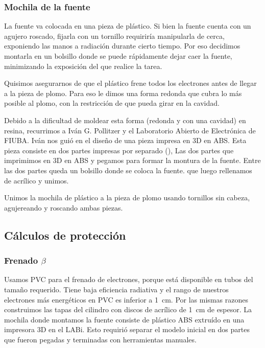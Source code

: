 \subsubsection{Mochila de la fuente}
La fuente va colocada en una pieza de plástico.
Si bien la fuente cuenta con un agujero roscado,
fijarla con un tornillo requiriría manipularla de cerca,
exponiendo las manos a radiación durante cierto tiempo.
Por eso decidimos montarla en un bolsillo donde se puede 
rápidamente dejar caer la fuente,
minimizando la exposición del que realice la tarea.

Quisimos asegurarnos de que el plástico frene todos los electrones antes de llegar a
la pieza de plomo. 
Para eso le dimos una forma redonda que cubra lo más posible al plomo,
con la restricción de que pueda girar en la cavidad.

Debido a la dificultad de moldear esta forma (redonda y con una cavidad)
en resina, recurrimos a Iván G. Pollitzer y el 
Laboratorio Abierto de Electrónica de FIUBA.
Iván nos guió en el diseño de una pieza impresa en 3D en ABS.
Esta pieza consiste en dos partes impresas por separado
(),
{Las dos partes que imprimimos en 3D en ABS y pegamos para formar la montura de
    la fuente.
Entre las dos partes queda un bolsillo donde se coloca la fuente.}
que luego rellenamos de acrílico y unimos.

Unimos la mochila de plástico a la pieza de plomo usando tornillos sin cabeza,
agujereando y roscando ambas piezas.
\subsection{Cálculos de protección}
\subsubsection{Frenado $\beta$}
Usamos PVC para el frenado de electrones, porque está disponible en tubos
del tamaño requerido.
Tiene baja eficiencia radiativa y el rango de nuestros electrones más
energéticos en PVC es inferior a \SI{1}{\centi\meter}.
Por las mismas razones construimos las tapas del cilindro con discos de
acrílico de \SI{1}{\centi\meter} de espesor.
La mochila donde montamos la fuente consiste de plástico ABS 
extruído en una impresora 3D en el LABi.
Esto requirió separar el modelo inicial en dos partes que fueron pegadas y
terminadas con herramientas manuales.
%
